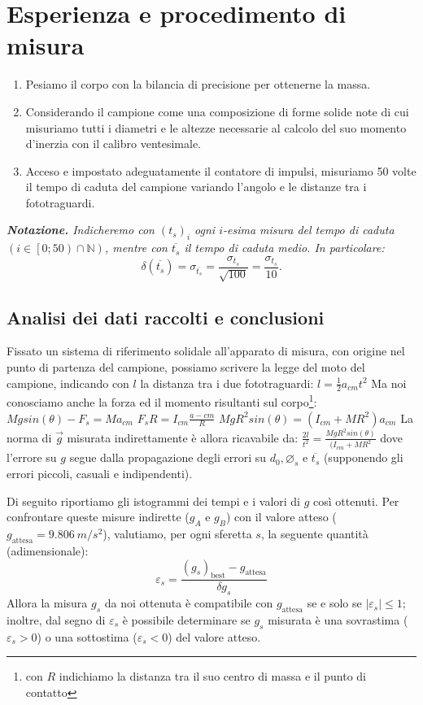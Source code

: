 \documentclass{article}
\newcommand*{\diam}{\varnothing}
\newcommand*{\bestp}[1]{{\left(#1\right)}_\text{best}}
\begin{document}
\section{Esperienza e procedimento di misura}
\begin{enumerate}
    \item
        Pesiamo il corpo con la bilancia di precisione per ottenerne la massa.
    \item
        Considerando il campione come una composizione di forme solide note
        di cui misuriamo tutti i diametri e le altezze necessarie al calcolo
        del suo momento d'inerzia con il calibro ventesimale.
    \item
        Acceso e impostato adeguatamente il contatore di impulsi,
        misuriamo 50 volte il tempo di caduta del campione
        variando l'angolo e le distanze tra i fototraguardi.
        
\end{enumerate}

\emph{
    \textbf{Notazione.} Indicheremo con $\left(t_s\right)_i$
    ogni $i$-esima misura del tempo di caduta
    $\left(i\in\left[0;50\right)\cap\mathbb{N}\right)$,
    mentre con $\overline{t_s}$ il tempo di caduta medio.
    In particolare:\[
        \delta\!\left(\overline{t_s}\right) = \sigma_{\overline{t_s}} =
        \frac{\sigma_{t_s}}{\sqrt{100}}   = \frac{\sigma_{t_s}}{10}.
    \]
}

\subsection{Analisi dei dati raccolti e conclusioni}
Fissato un sistema di riferimento solidale all'apparato di misura,
con origine nel punto di partenza del campione, possiamo scrivere 
la legge del moto del campione, indicando con $l$ la distanza tra
i due fototraguardi:
$l = \frac{1}{2} a_{cm} t^2$
Ma noi conosciamo anche la forza ed il momento risultanti sul
corpo\footnote{con $R$ indichiamo la distanza tra il suo centro di
massa e il punto di contatto}:
$M g sin(\theta) - F_s = Ma_{cm}$
$F_s R = I_{cm} \frac{a-{cm}}{R}$
$M g R^2 sin(\theta) = (I_{cm} + MR^2) a_{cm}$
La norma di $\vec{g}$ misurata indirettamente è allora ricavabile da:
$\frac{2 l}{t^2} = \frac{M g R^2 sin(\theta)}{(I_{cm} + MR^2}$
dove l'errore su $g$ segue dalla propagazione degli errori su $d_0,\diam_s$ e
$\overline{t_s}$ (supponendo gli errori piccoli, casuali e indipendenti). %

Di seguito riportiamo gli istogrammi dei tempi e i valori di $g$ così ottenuti.
Per confrontare queste misure indirette ($g_A$ e $g_B$) con il valore atteso
($g_\text{attesa}=\qty{9.806}{m\per s^2}$), valutiamo, per ogni sferetta $s$, la seguente quantità
(adimensionale):\[\varepsilon_s = \frac{\bestp{g_s} - g_\text{attesa}}{\delta g_s}
\] Allora la misura $g_s$ da noi ottenuta è compatibile con $g_\text{attesa}$ se e solo se
$\left|\varepsilon_s\right|\le1$; inoltre, dal segno di $\varepsilon_s$ è possibile
determinare se $g_s$ misurata è una sovrastima ($\varepsilon_s>0$) o una sottostima
($\varepsilon_s<0$) del valore atteso.
\end{document}

